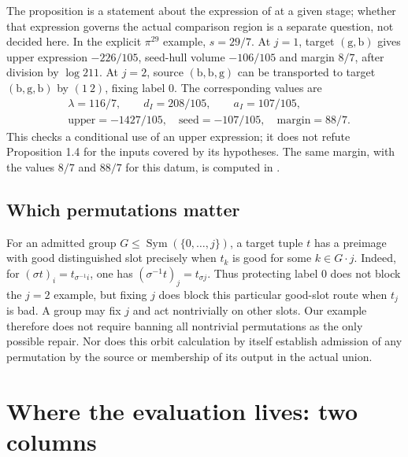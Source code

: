 \documentclass[11pt]{article}
\theoremstyle{plain}
\theoremstyle{definition}
\begin{document}
The proposition is a statement about the expression of
\cite[Prop.~1.4(iii)]{IUT4} at a given stage; whether that expression governs
the actual comparison region is a separate question, not decided here.  In the
explicit $\pi^{29}$ example,
$s=29/7$.  At $j=1$, target $(\mathrm g,\mathrm b)$ gives upper expression
$-226/105$, seed-hull volume $-106/105$ and margin $8/7$, after division by
$\log211$.  At $j=2$, source $(\mathrm b,\mathrm b,\mathrm g)$ can be
transported to target $(\mathrm b,\mathrm g,\mathrm b)$ by $(1\ 2)$,
fixing label $0$.  The corresponding values are
\[
\begin{aligned}
 &\lambda=116/7,\qquad d_I=208/105,\qquad a_I=107/105,\\
 &\text{upper}=-1427/105,\quad\text{seed}=-107/105,\quad
   \text{margin}=88/7.
\end{aligned}
\]
This checks a conditional use of an upper expression; it does not refute
Proposition 1.4 for the inputs covered by its hypotheses.  The same margin, with the
values $8/7$ and $88/7$ for this datum, is computed in \cite[\S6, Theorems~5 and~6]{First}.

\subsection*{Which permutations matter}

For an admitted group $G\le\operatorname{Sym}(\{0,\ldots,j\})$, a target
tuple $t$ has a preimage with good distinguished slot precisely when
$t_k$ is good for some $k\in G\cdot j$.  Indeed, for
$(\sigma t)_i=t_{\sigma^{-1}i}$, one has
$(\sigma^{-1}t)_j=t_{\sigma j}$.
Thus protecting label $0$ does not block the $j=2$ example, but fixing $j$
does block this particular good-slot route when $t_j$ is bad.  A group may
fix $j$ and act nontrivially on other slots.  Our example therefore does not
require banning all nontrivial permutations as the only possible repair.
Nor does this orbit calculation by itself establish admission of any
permutation by the source or membership of its output in the actual union.


\section{Where the evaluation lives: two columns}\label{s:columns}
\end{document}
